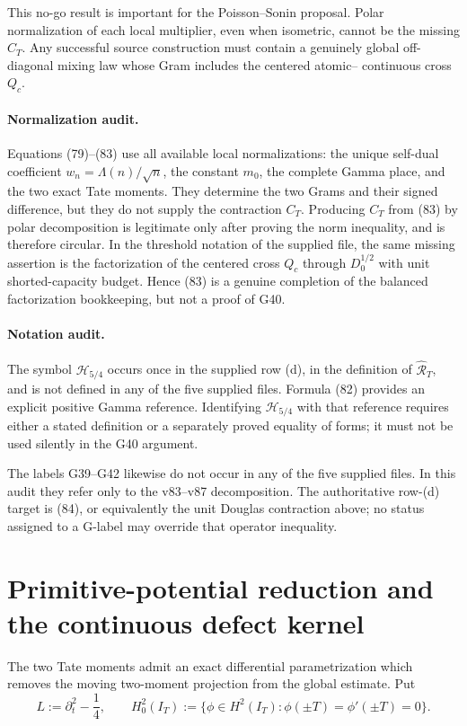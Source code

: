 \documentclass[11pt]{article}
\begin{document}
This no-go result is important for the Poisson--Sonin proposal.  Polar
normalization of each local multiplier, even when isometric, cannot be the
missing $C_T$.  Any successful source construction must contain a genuinely
global off-diagonal mixing law whose Gram includes the centered atomic--
continuous cross $Q_c$.

\paragraph{Normalization audit.}
Equations (79)--(83) use all available local normalizations: the unique
self-dual coefficient $w_n=\Lambda(n)/\sqrt n$, the constant $m_0$, the
complete Gamma place, and the two exact Tate moments.  They determine the
two Grams and their signed difference, but they do not supply the contraction
$C_T$.  Producing $C_T$ from (83) by polar decomposition is legitimate only
after proving the norm inequality, and is therefore circular.  In the
threshold notation of the supplied file, the same missing assertion is the
factorization of the centered cross $Q_c$ through $D_0^{1/2}$ with unit
shorted-capacity budget.  Hence (83) is a genuine completion of the balanced
factorization bookkeeping, but not a proof of G40.

\paragraph{Notation audit.}
The symbol $\mathcal H_{5/4}$ occurs once in the supplied row (d), in the
definition of $\widehat{\mathcal R}_T$, and is not defined in any of the five
supplied files.  Formula (82) provides an explicit positive Gamma reference.
Identifying $\mathcal H_{5/4}$ with that reference requires either a stated
definition or a separately proved equality of forms; it must not be used
silently in the G40 argument.

The labels G39--G42 likewise do not occur in any of the five supplied files.
In this audit they refer only to the v83--v87 decomposition.  The authoritative
row-(d) target is (84), or equivalently the unit Douglas contraction above;
no status assigned to a G-label may override that operator inequality.

\section{Primitive-potential reduction and the continuous defect kernel}

The two Tate moments admit an exact differential parametrization which
removes the moving two-moment projection from the global estimate.  Put
\[
 L:=\partial_t^2-\frac14,
 \qquad H_0^2(I_T):=\{\phi\in H^2(I_T):
 \phi(\pm T)=\phi'(\pm T)=0\}.
\]
\end{document}
